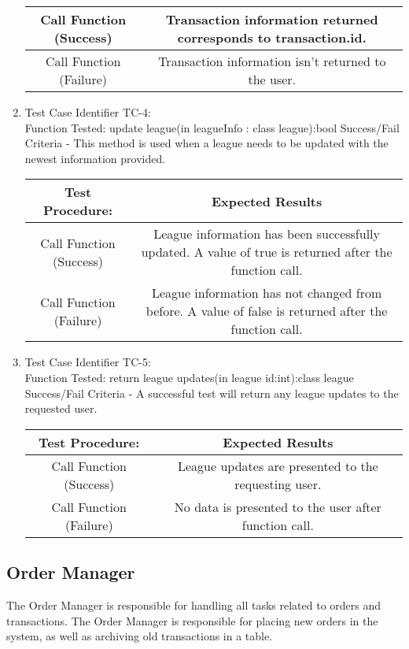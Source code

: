 \begin{enumerate}
\begin{tabular}{| c | c |}
    Call Function (Success) & Transaction information returned corresponds to
    transaction.id. \\ \hline
    Call Function (Failure) & Transaction information isn't returned to the
    user. \\ \hline
    \end{tabular}
  \item
  Test Case Identifier TC-4:\\
    Function Tested: update league(in leagueInfo : class league):bool
    Success/Fail Criteria - This method is used when a league needs to be
    updated with the newest information provided.\\
    \begin{tabular}{| c | c |}
    \hline
    \textbf{Test Procedure:} & \textbf{Expected Results} \\ \hline
    Call Function (Success) & League information has been successfully updated.
    A value of true is returned after the function call. \\ \hline
    Call Function (Failure) & League information has not changed from before.
    A value of false is returned after the function call. \\ \hline
    \end{tabular}
  \item
  Test Case Identifier TC-5:\\
    Function Tested: return league updates(in league id:int):class league
    Success/Fail Criteria - A successful test will return any league updates
    to the requested user.\\
    \begin{tabular}{| c | c |}
    \hline
    \textbf{Test Procedure:} & \textbf{Expected Results} \\ \hline
    Call Function (Success) & League updates are presented to the requesting
    user. \\ \hline
    Call Function (Failure) & No data is presented to the user after function
    call. \\ \hline
    \end{tabular}
  \end{enumerate}

\subsection{Order Manager}

The Order Manager is responsible for handling all tasks related to orders and
transactions.  The Order Manager is responsible for placing new orders in the
system, as well as archiving old transactions in a table.\\

